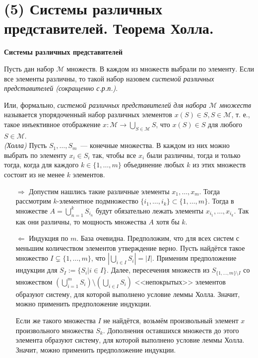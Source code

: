 \section{(5) Системы различных представителей. Теорема Холла.}

\textbf{Системы различных представителей}

\Def Пусть дан набор $\mathcal{M}$ множеств. В каждом из множеств выбрали по элементу. Если все элементы различны, то такой набор назовем \textit{системой различных представителей (сокращенно с.р.п.)}. \par
Или, формально, \textit{системой различных представителей для набора $\mathcal{M}$ множеств} называется упорядоченный набор различных элементов $x(S) \in S, S \in \mathcal{M}$, т. е., такое инъективное отображение $x : \mathcal{M} \rightarrow \bigcup\limits_{S \in \mathcal{M}}S$, что $x(S) \in S$ для любого $S \in \mathcal{M}$.\\

\Th \textit{(Холла)} Пусть $S_1, \ldots, S_m$~--- конечные множества. В каждом из них можно выбрать по элементу $x_i \in S_i$ так, чтобы все $x_i$ были различны, тогда и только тогда, когда для каждого $k \in \{1, \ldots, m\}$ объединение любых $k$ из этих множеств состоит из не менее $k$ элементов.

\begin{itemize}
    \item[$\Rightarrow$] Допустим нашлись такие различные элементы $x_1, \ldots, x_m$. Тогда рассмотрим $k$-элементное подмножество $\{i_1, \ldots, i_k\} \subset \{1, \ldots, m\}$. Тогда в множестве $A = \bigcup\limits_{n = 1}^k S_{i_n}$ будут обязательно лежать элементы $x_{i_1}, \ldots, x_{i_k}$. Так как они различны, то мощность множества $A$ хотя бы $k$.
    \item[$\Leftarrow$] Индукция по $m$. База очевидна. Предположим, что для всех систем с меньшим количеством элементов утверждение верно. Пусть найдётся такое множество $I \subsetneq \{1, \dots, m\}$, что $|\bigcup\limits_{i \in I} S_i| = |I|$. Применим предположение индукции для $S_I := \{S_i | i \in I\}$. Далее, пересечения множеств из $S_{\{1, \ldots, m\} \setminus I}$ со множеством $(\bigcup\limits_{i = 1}^m S_i) \setminus (\bigcup\limits_{i \in I} S_i)$ <<непокрытых>> элементов образуют систему, для которой выполнено условие леммы Холла. Значит, можно применить предположение индукции.

    Если же такого множества $I$ не найдётся, возьмём произвольный элемент $x$ произвольного множества $S_k$. Дополнения оставшихся множеств до этого элемента образуют систему, для которой выполнено условие леммы Холла. Значит, можно применить предположение индукции.
\end{itemize}
\newpage{}

